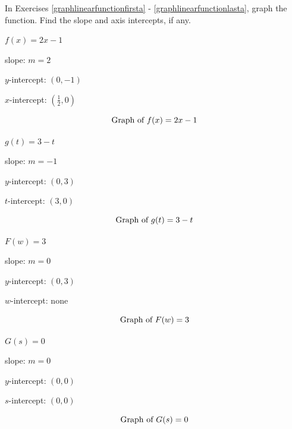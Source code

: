 \documentclass{ximera}
\begin{document}
	\author{Stitz-Zeager}


\begin{question}
In Exercises \ref{graphlinearfunctionfirsta} - \ref{graphlinearfunctionlasta}, graph the function.  Find the slope and  axis intercepts, if any.

\begin{problem}\label{graphlinearfunctionfirsta}
$f(x) = 2x - 1$

\begin{solution}
slope: $m = 2$

$y$-intercept:  $(0,-1)$

$x$-intercept: $\left(\frac{1}{2}, 0 \right)$

$$\text{Graph of $f(x) = 2x - 1$}$$
\end{solution}
\end{problem}

\begin{problem}
$g(t) = 3 - t$

\begin{solution}
slope: $m = -1$

$y$-intercept:  $(0,3)$

$t$-intercept: $(3, 0)$

$$\text{Graph of $g(t) = 3 - t$}$$
\end{solution}
\end{problem}

\begin{problem}
$F(w) = 3$

\begin{solution}
slope: $m = 0$

$y$-intercept:  $(0,3)$

$w$-intercept: none

$$\text{Graph of $F(w) = 3$}$$
\end{solution}
\end{problem}
 
\begin{problem}
$G(s) = 0$

\begin{solution}
slope: $m = 0$

$y$-intercept:  $(0,0)$

$s$-intercept: $(0,0)$

$$\text{Graph of $G(s) = 0$}$$
\end{solution}
\end{problem}


\end{question}
\end{document}
